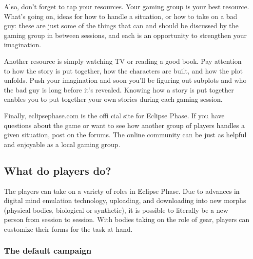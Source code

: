 Also, don't forget to tap your resources. Your gaming group is your best resource. What's going on, ideas for how to handle a situation, or how to take on a bad guy: these are just some of the things that can and should be discussed by the gaming group in between sessions, and each is an opportunity to strengthen your imagination. 

Another resource is simply watching TV or reading a good book. Pay attention to how the story is put together, how the characters are built, and how the plot unfolds. Push your imagination and soon you'll be figuring out subplots and who the bad guy is long before it's revealed. Knowing how a story is put together enables you to put together your own stories during each gaming session. 

Finally, eclipsephase.com is the offi cial site for Eclipse Phase. If you have questions about the game or want to see how another group of players handles a given situation, post on the forums. The online community can be just as helpful and enjoyable as a local gaming group. 



\subsection{What do players do?} \label{sec:what-do-players} 

The players can take on a variety of roles in Eclipse Phase. Due to advances in digital mind emulation technology, uploading, and downloading into new morphs (physical bodies, biological or synthetic), it is possible to literally be a new person from session to session. With bodies taking on the role of gear, players can customize their forms for the task at hand. 



\subsubsection{The default campaign} \label{sec:default-campaign} 

